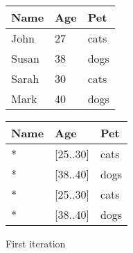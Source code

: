 \begin{figure}[H]
    \centering
    \begin{tabular}{l l l}
        \toprule
        \textbf{Name} & \textbf{Age} & \textbf{Pet} \\
        \midrule
        John  & 27 & cats \\
        Susan & 38 & dogs \\
        Sarah & 30 & cats \\
        Mark  & 40 & dogs \\
        \bottomrule
    \end{tabular}
    \quad
    \begin{tabular}{l l l}
        \toprule
        \textbf{Name} & \textbf{Age} & \textbf{Pet} \\
        \midrule
        *	& [25..30]	& cats \\
        *	& [38..40]	& dogs \\
        *	& [25..30]	& cats \\
        *	& [38..40]	& dogs \\
        \bottomrule
    \end{tabular}
    \caption{First iteration}\label{fig:continuous_step1}
\end{figure}